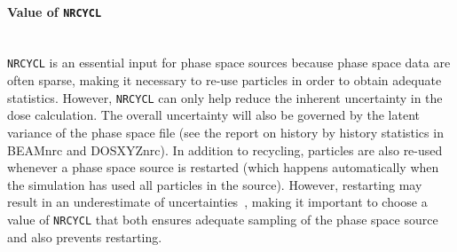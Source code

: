 \documentclass[12pt,twoside]{article}
\begin{document}
\paragraph{Value of {\tt NRCYCL}}\mbox{}\\
{\tt NRCYCL} is an essential input for phase space sources because
phase space data are often sparse, making it necessary to re-use particles
in order to obtain adequate statistics.  However, {\tt NRCYCL} can only
help reduce the inherent uncertainty in the dose calculation. The overall
uncertainty will also be governed by the latent variance of the phase space file (see the
report on history by history
statistics in BEAMnrc and DOSXYZnrc\cite{Wa02a}).
In addition to recycling, particles are also re-used whenever a phase space source is restarted
(which happens automatically when the simulation has used all particles in the
source).  However, restarting may result in an underestimate of
uncertainties~\cite{Wa02a}, making it important to choose a value
of {\tt NRCYCL} that both ensures adequate sampling of the phase space
source and also prevents restarting.
\end{document}
